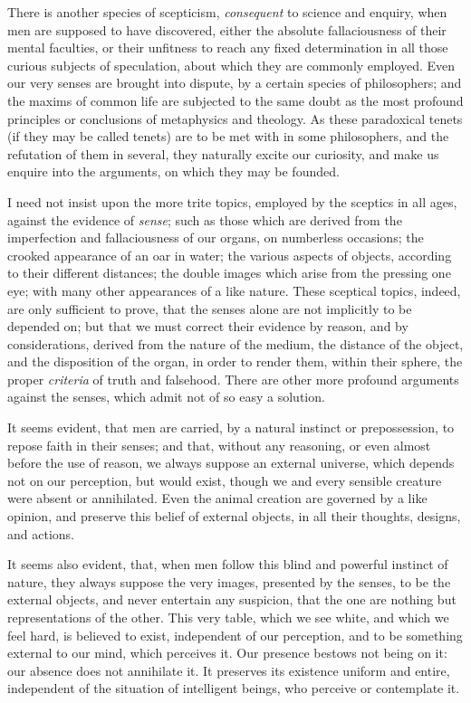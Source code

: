 \documentclass[]{article}
\begin{document}
\begin{sectionbody}
\humeparagraph  There is another species of scepticism, \emph{consequent} to science and enquiry, when men are supposed to have discovered, either the absolute fallaciousness of their mental faculties, or their unfitness to reach any fixed determination in all those curious subjects of speculation, about which they are commonly employed. Even our very senses are brought into dispute, by a certain species of philosophers; and the maxims of common life are subjected to the same doubt as the most profound principles or conclusions of metaphysics and theology. As these paradoxical tenets (if they may be called tenets) are to be met with in some philosophers, and the refutation of them in several, they naturally excite our curiosity, and make us enquire into the arguments, on which they may be founded.

\humeparagraph  I need not insist upon the more trite topics, employed by the sceptics in all ages, against the evidence of \emph{sense}; such as those which are derived from the imperfection and fallaciousness of our organs, on numberless occasions; the crooked appearance of an oar in water; the various aspects of objects, according to their different distances; the double images which arise from the pressing one eye; with many other appearances of a like nature. These sceptical topics, indeed, are only sufficient to prove, that the senses alone are not implicitly to be depended on; but that we must correct their evidence by reason, and by considerations, derived from the nature of the medium, the distance of the object, and the disposition of the organ, in order to render them, within their sphere, the proper \emph{criteria} of truth and falsehood. There are other more profound arguments against the senses, which admit not of so easy a solution.

\humeparagraph  It seems evident, that men are carried, by a natural instinct or prepossession, to repose faith in their senses; and that, without any reasoning, or even almost before the use of reason, we always suppose an external universe, which depends not on our perception, but would exist, though we and every sensible creature were absent or annihilated. Even the animal creation are governed by a like opinion, and preserve this belief of external objects, in all their thoughts, designs, and actions.

\humeparagraph  It seems also evident, that, when men follow this blind and powerful instinct of nature, they always suppose the very images, presented by the senses, to be the external objects, and never entertain any suspicion, that the one are nothing but representations of the other. This very table, which we see white, and which we feel hard, is believed to exist, independent of our perception, and to be something external to our mind, which perceives it. Our presence bestows not being on it: our absence does not annihilate it. It preserves its existence uniform and entire, independent of the situation of intelligent beings, who perceive or contemplate it.


\end{sectionbody}
\end{document}
